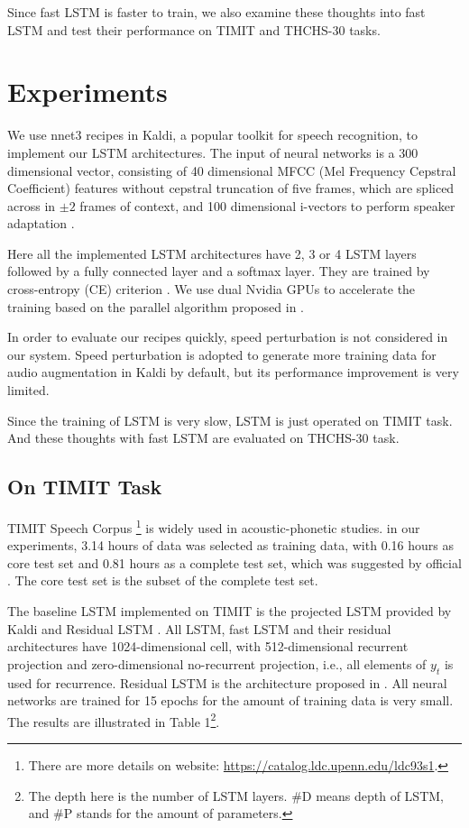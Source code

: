 \documentclass[a4paper]{article}
\begin{document}
Since fast LSTM is faster to train, we also examine these thoughts into fast LSTM and test their performance on TIMIT and THCHS-30 tasks.

\section{Experiments}

We use nnet3 recipes in Kaldi, a popular toolkit for speech recognition, to implement our LSTM architectures.
The input of neural networks is a 300 dimensional vector,
consisting of 40 dimensional MFCC (Mel Frequency Cepstral Coefficient) features without cepstral truncation of five frames,
which are spliced across in $\pm 2$ frames of context, and 100 dimensional i-vectors to perform speaker adaptation \cite{ivector}.

Here all the implemented LSTM architectures have 2, 3 or 4 LSTM layers followed by a fully connected layer and a softmax layer.
They are trained by cross-entropy (CE) criterion \cite{ce}.
We use dual Nvidia GPUs to accelerate the training based on the parallel algorithm proposed in \cite{kaldi-gpus}.

In order to evaluate our recipes quickly, speed perturbation \cite{audio-aug} is not considered in our system.
Speed perturbation is adopted to generate more training data for audio augmentation in Kaldi by default,
but its performance improvement is very limited.

Since the training of LSTM is very slow, LSTM is just operated on TIMIT task.
And these thoughts with fast LSTM are evaluated on THCHS-30 task.


\subsection{On TIMIT Task}

TIMIT Speech Corpus \footnote{There are more details on website: \url{https://catalog.ldc.upenn.edu/ldc93s1}.} is widely used in acoustic-phonetic studies.
in our experiments, 3.14 hours of data was selected as training data, with 0.16 hours as core test set and 0.81 hours as a complete test set,
which was suggested by official \cite{timit-off}. The core test set is the subset of the complete test set.

The baseline LSTM implemented on TIMIT is the projected LSTM provided by Kaldi and Residual LSTM \cite{residual-lstm}.
All LSTM, fast LSTM and their residual architectures have 1024-dimensional cell,
with 512-dimensional recurrent projection and zero-dimensional no-recurrent projection,
i.e., all elements of $y_t$ is used for recurrence.
Residual LSTM is the architecture proposed in \cite{residual-lstm}.
All neural networks are trained for 15 epochs for the amount of training data is very small.
The results are illustrated in Table 1\footnote{The depth here is the number of LSTM layers. \#D means depth of LSTM, and \#P stands for the amount of parameters.}.
\end{document}
